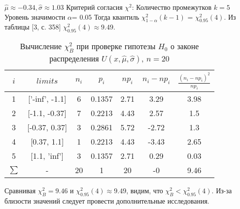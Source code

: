 $\hat{\mu} \approx -0.34, \hat{\sigma} \approx 1.03$
\newline
Критерий согласия $\chi^{2}$:
\newline
Количество промежутков $k = 5$
\newline
Уровень значимости $\alpha$= 0.05
\newline
Тогда квантиль $\chi^{2}_{1-\alpha}(k-1)$ = $\chi^{2}_{0.95}(4)$. Из таблицы [3, с. 358] $\chi^{2}_{0.95}(4) \approx 9.49$.
\begin{table}[H]
	\centering
	\begin{tabular}{| c | c | c | c | c | c | c |}
		\hline
		$i$ & $limits$         &   $n_i$ &    $p_i$ &   $np_i$ &   $n_i - np_i$ &   $\frac{(n_i-np_i)^2}{np_i}$ \\
		\hline
   1 & ['-inf', -1.1] &     6 & 0.1357 &   2.71 &         3.29 &                        3.98 \\
   2 & [-1.1, -0.37]  &     7 & 0.2213 &   4.43 &         2.57 &                        1.5  \\
   3 & [-0.37, 0.37]  &     3 & 0.2861 &   5.72 &        -2.72 &                        1.3  \\
   4 & [0.37, 1.1]    &     1 & 0.2213 &   4.43 &        -3.43 &                        2.65 \\
   5 & [1.1, 'inf']   &     3 & 0.1357 &   2.71 &         0.29 &                        0.03 \\
   $\sum$ & -            &    20 & 1      &  20    &        -0    &                        9.46 \\
		\hline
	\end{tabular}
	\caption{ Вычисление $\chi^{2}_{B}$ при проверке гипотезы $H_{0}$ о законе распределения $U(x,\hat{\mu}, \hat{\sigma})$, $n=20$}
	\label{tab:uniform_chi_2}
\end{table}

\noindent Сравнивая $\chi^{2}_{B} = 9.46$ и $\chi^{2}_{0.95}(4) \approx 9.49$, видим, что $\chi^{2}_{B} < \chi^{2}_{0.95}(4)$.
Из-за близости значений следует провести дополнительные исследования.
\\
